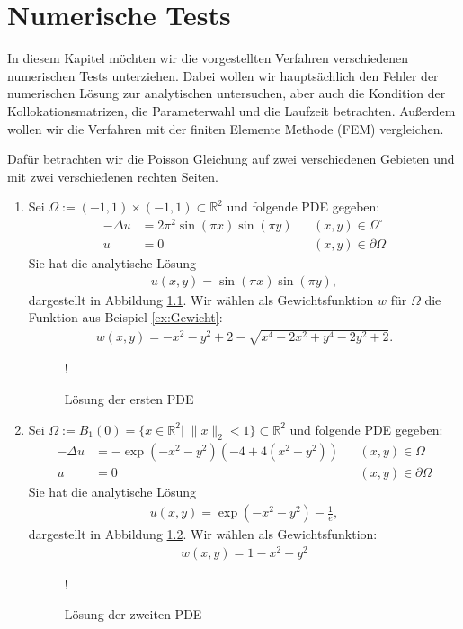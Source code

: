 \chapter{Numerische Tests}
\label{cha:NumerischeTests}

In diesem Kapitel möchten wir die vorgestellten Verfahren verschiedenen numerischen Tests unterziehen. Dabei wollen wir hauptsächlich den Fehler der numerischen Lösung zur analytischen untersuchen, aber auch die Kondition der Kollokationsmatrizen, die Parameterwahl und die Laufzeit betrachten. Außerdem wollen wir die Verfahren mit der finiten Elemente Methode (\acs{FEM}) vergleichen. 

Dafür betrachten wir die Poisson Gleichung auf zwei verschiedenen Gebieten und mit zwei verschiedenen rechten Seiten.
\begin{enumerate}
\item
Sei $\Omega := (-1,1) \times (-1,1) \subset \mathbb{R}^2$ und folgende \ac{PDE} gegeben:
\begin{align*}
- \Delta u &= 2\pi^2 \sin(\pi x)\sin(\pi y)&& (x,y) \in \Omega^\circ\\
u &= 0&& (x,y) \in \partial \Omega
\end{align*}
Sie hat die analytische Lösung 
\begin{align*}
u(x,y) = \sin(\pi x)\sin(\pi y),
\end{align*}
dargestellt in Abbildung \ref{fig:pde1sol}. Wir wählen als Gewichtsfunktion $w$ für $\Omega$ die Funktion aus Beispiel \ref{ex:Gewicht}:
\begin{align*}
w(x,y) = -x^2-y^2+2 - \sqrt{x^4 -2x^2 + y^4 -2y^2+2}.
\end{align*}
\begin{figure}[ht]
\centering
\resizebox {\columnwidth} {!} {

}
\caption{Lösung der ersten \acs{PDE}}
\label{fig:pde1sol}
\end{figure}
\item
Sei $\Omega := B_1(0) = \{x \in \mathbb{R}^2 |\; \|x\|_2 < 1\} \subset \mathbb{R}^2$ und folgende \ac{PDE} gegeben:
\begin{align*}
- \Delta u &= -\exp(-x^2 -y^2)(-4+4(x^2+y^2)) && (x,y)  \in \Omega\\
u &= 0&& (x,y) \in \partial \Omega
\end{align*}
Sie hat die analytische Lösung 
\begin{align*}
u(x,y) = \exp(-x^2-y^2) - \frac{1}{e},
\end{align*}  dargestellt in Abbildung \ref{fig:pde2sol}. Wir wählen als Gewichtsfunktion:
\begin{align*}
w(x,y) = 1 -x^2 -y^2
\end{align*}
\begin{figure}[ht]
\centering
\resizebox {\columnwidth} {!} {

}
\caption{Lösung der zweiten \acs{PDE}}
\label{fig:pde2sol}
\end{figure}
\end{enumerate}


